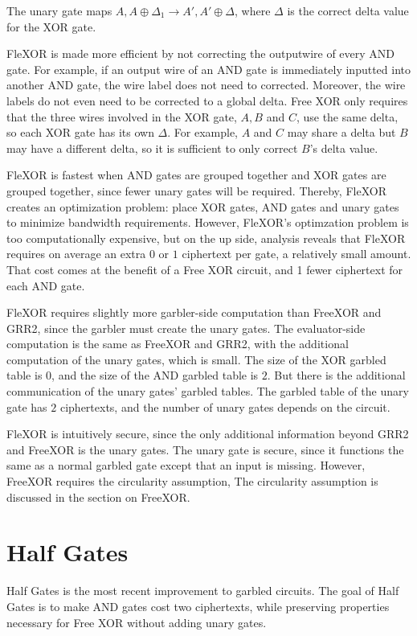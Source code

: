 The unary gate maps $A,A \oplus \Delta_1 \to A', A' \oplus \Delta$, where $\Delta$ is the correct delta value for the XOR gate.

FleXOR is made more efficient by not correcting the outputwire of every AND gate.
For example, if an output wire of an AND gate is immediately inputted into another AND gate, the wire label does not need to corrected.
Moreover, the wire labels do not even need to be corrected to a global delta.
Free XOR only requires that the three wires involved in the XOR gate, $A, B$ and $C$, use the same delta, so each XOR gate has its own $\Delta$.
For example, $A$ and $C$ may share a delta but $B$ may have a different delta, so it is sufficient to only correct $B$'s delta value.

FleXOR is fastest when AND gates are grouped together and XOR gates are grouped together, since fewer unary gates will be required.
Thereby, FleXOR creates an optimization problem: place XOR gates, AND gates and unary gates to minimize bandwidth requirements.
However, FleXOR's optimzation problem is too computationally expensive, but on the up side, analysis reveals that FleXOR requires on average an extra $0$ or $1$ ciphertext per gate, a relatively small amount.
That cost comes at the benefit of a Free XOR circuit, and 1 fewer ciphertext for each AND gate.

FleXOR requires slightly more garbler-side computation than FreeXOR and GRR2, since the garbler must create the unary gates.
The evaluator-side computation is the same as FreeXOR and GRR2, with the additional computation of the unary gates, which is small.
The size of the XOR garbled table is $0$, and the size of the AND garbled table is $2$.
But there is the additional communication of the unary gates' garbled tables.
The garbled table of the unary gate has $2$ ciphertexts, and the number of unary gates depends on the circuit.

FleXOR is intuitively secure, since the only additional information beyond GRR2 and FreeXOR is the unary gates.
The unary gate is secure, since it functions the same as a normal garbled gate except that an input is missing.
However, FreeXOR requires the circularity assumption, 
The circularity assumption is discussed in the section on FreeXOR.

\section{Half Gates}
Half Gates is the most recent improvement to garbled circuits.
The goal of Half Gates is to make AND gates cost two ciphertexts, while preserving properties necessary for Free XOR without adding unary gates. 

